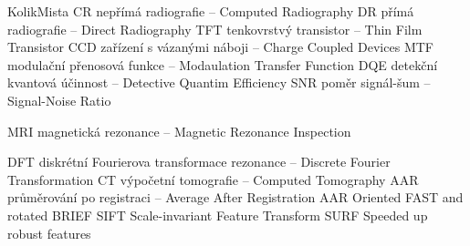 \begin{seznamzkratek}{KolikMista}
			{CR}
			{nepřímá radiografie -- Computed Radiography}
			{DR}
			{přímá radiografie -- Direct Radiography}
			{TFT}
			{tenkovrstvý transistor -- Thin Film Transistor}
			{CCD}
			{zařízení s vázanými náboji -- Charge Coupled Devices}
			{MTF}
			{modulační přenosová funkce -- Modaulation Transfer Function}
			{DQE}
			{detekční kvantová účinnost -- Detective Quantim Efficiency}
			{SNR}
			{poměr signál-šum -- Signal-Noise Ratio}

			{MRI}
			{magnetická rezonance -- Magnetic Rezonance Inspection}
			
			{DFT}
			{diskrétní Fourierova transformace rezonance -- Discrete Fourier Transformation}
			{CT}
			{výpočetní tomografie -- Computed Tomography}
			{AAR}
			{průměrování po registraci -- Average After Registration}
			{AAR}
			{Oriented FAST and rotated BRIEF}
			{SIFT}
			{Scale-invariant Feature Transform}
			{SURF}
			{Speeded up robust features}
\end{seznamzkratek}
